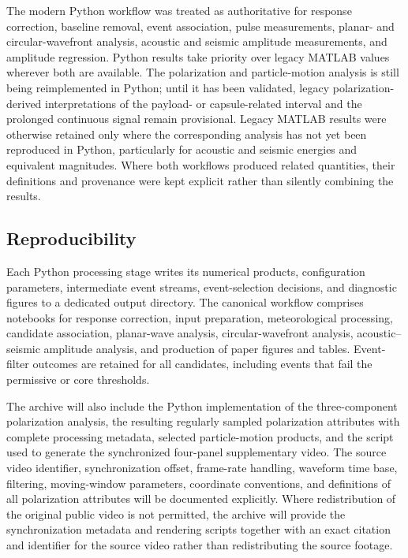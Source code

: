\documentclass[]{seismica}
\begin{document}
The modern Python workflow was treated as authoritative for response
correction, baseline removal, event association, pulse measurements, planar-
and circular-wavefront analysis, acoustic and seismic amplitude measurements,
and amplitude regression. Python results take priority over legacy MATLAB
values wherever both are available. The polarization and particle-motion
analysis is still being reimplemented in Python; until it has been validated,
legacy polarization-derived interpretations of the payload- or capsule-related
interval and the prolonged continuous signal remain provisional. Legacy MATLAB
results were otherwise retained only where the corresponding analysis has not
yet been reproduced in Python, particularly for acoustic and seismic energies
and equivalent magnitudes. Where both workflows produced related quantities,
their definitions and provenance were kept explicit rather than silently
combining the results.

\subsection{Reproducibility}

Each Python processing stage writes its numerical products, configuration parameters, intermediate event streams, event-selection decisions, and diagnostic figures to a dedicated output directory. The canonical workflow comprises notebooks for response correction, input preparation, meteorological processing, candidate association, planar-wave analysis, circular-wavefront analysis, acoustic--seismic amplitude analysis, and production of paper figures and tables. Event-filter outcomes are retained for all candidates, including events that fail the permissive or core thresholds.

The archive will also include the Python implementation of the
three-component polarization analysis, the resulting regularly sampled
polarization attributes with complete processing metadata, selected
particle-motion products, and the script used to generate the synchronized
four-panel supplementary video. The source video identifier, synchronization
offset, frame-rate handling, waveform time base, filtering, moving-window
parameters, coordinate conventions, and definitions of all polarization
attributes will be documented explicitly. Where redistribution of the original
public video is not permitted, the archive will provide the synchronization
metadata and rendering scripts together with an exact citation and identifier
for the source video rather than redistributing the source footage.
\end{document}
